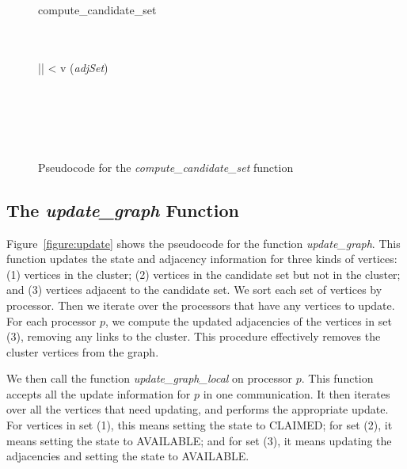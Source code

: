 \documentclass[10pt]{article}
\begin{document}
\begin{sloppypar}
\begin{center}
\begin{figure}
\begin{algorithm}{compute\_candidate\_set}{}
 \\
 \\
 \\
\begin{WHILE}{ \neq \emptyset {} 
|| < }
v \leftarrow {}(\mbox{\emph{adjSet}}) \\
 \\
 \\
 \\
\end{WHILE} \\
\end{algorithm}
\caption{Pseudocode for the \emph{compute\_candidate\_set} function}
\label{figure:compute_cset}
\end{figure}
\end{center}

\subsection{The \emph{update\_graph} Function}
\label{section:update}

Figure~\ref{figure:update} shows the pseudocode for the function
\emph{update\_graph}.  This function updates the state and
adjacency information for three kinds of vertices: (1) vertices in the
cluster; (2) vertices in the candidate set but not in the cluster; and
(3) vertices adjacent to the candidate set.  We sort each
set of vertices by processor.  Then we iterate over the processors
that have any vertices to update.  For each processor $p$, we compute the
updated adjacencies of the vertices in set (3), removing any links to
the cluster.  This procedure effectively removes the cluster vertices
from the graph.

We then call the function \emph{update\_graph\_local} on processor $p$.  This
function accepts all the update information for $p$ in one
communication.  It then iterates over all the vertices that need
updating, and performs the appropriate update.  For vertices in set
(1), this means setting the state to CLAIMED; for set (2), it means
setting the state to AVAILABLE; and for set (3), it means updating the
adjacencies and setting the state to AVAILABLE.


\end{sloppypar}
\end{document}
